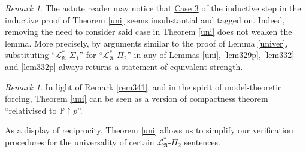 \documentclass[12pt, twoside]{memoir}
\numberwithin{equation}{section}
\theoremstyle{definition}
\theoremstyle{remark}
\newtheorem{rem}[thm]{Remark}
\theoremstyle{definition}
\theoremstyle{definition}
\theoremstyle{definition}
\theoremstyle{remark}
\begin{document}
\begin{rem}\label{rem333}
The astute reader may notice that \hyperref[526c3]{Case 3} of the inductive step in the inductive proof of Theorem \ref{uni} seems insubstantial and tagged on. Indeed, removing the need to consider said case in Theorem \ref{uni} does not weaken the lemma. More precisely, by arguments similar to the proof of Lemma \ref{univer}, substituting ``$\mathcal{L}^{*}_{\mathfrak{A}}$-$\Sigma_1$'' for ``$\mathcal{L}^{*}_{\mathfrak{A}}$-$\Pi_2$'' in any of Lemmas \ref{uni}, \ref{lem329p}, \ref{lem332} and \ref{lem332p} always returns a statement of equivalent strength.
\end{rem}

\begin{rem}
In light of Remark \ref{rem341}, and in the spirit of model-theoretic forcing, Theorem \ref{uni} can be seen as a version of compactness theorem ``relativised to $\mathbb{P} \restriction p$''.
\end{rem}

As a display of reciprocity, Theorem \ref{uni} allows us to simplify our verification procedures for the universality of certain $\mathcal{L}^{*}_{\mathfrak{A}}$-$\Pi_2$ sentences. 
\end{document}
